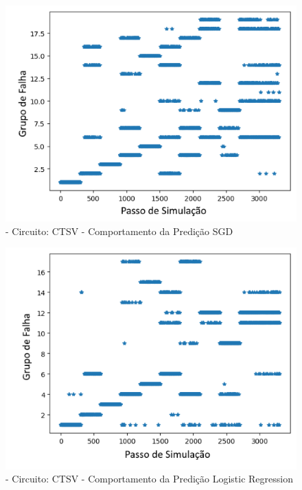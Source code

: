         
        \begin{figure}[H]
        \begin{center}
        \includegraphics[width=13cm]{./01_Pre_textuais/ctsv_figs/SGDClassifier_CTSV_mc_+_4bitPRBS_[FALHA]raw.png}
        \caption{\label{fig:DecisionTreeClassifieSalenkey}- Circuito: CTSV - Comportamento da Predição SGD}
        \end{center}
        \end{figure}
        
        
        \begin{figure}[H]
        \begin{center}
        \includegraphics[width=13cm]{./01_Pre_textuais/ctsv_figs/LogisticRegression_CTSV_mc_+_4bitPRBS_[FALHA]raw.png}
        \caption{\label{fig:DecisionTreeClassifieSalenkey}- Circuito: CTSV - Comportamento da Predição Logistic Regression }
        \end{center}
        \end{figure}
        
